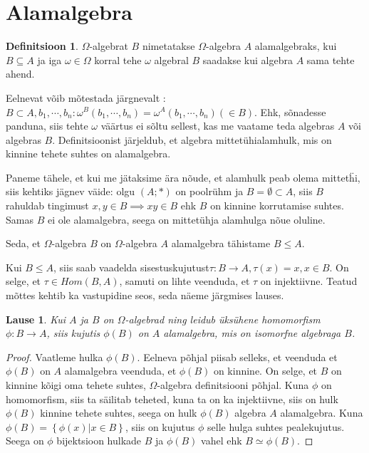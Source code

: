\documentclass[12pt]{report}
\numberwithin{equation}{section}
\theoremstyle{definition}
\newtheorem{alamalgebra}[equation]{Definitsioon}
\theoremstyle{plain}
\newtheorem{kui_leidub_homomorfism_leidub_alamalgebra}[equation]{Lause}
\begin{document}
\section{Alamalgebra}

\begin{alamalgebra}
$\Omega$-algebrat $B$ nimetatakse $\Omega$-algebra $A$ alamalgebraks, kui $B \subseteq A$ ja iga $\omega \in \Omega$ korral tehe $\omega$ algebral $B$ saadakse kui algebra $A$ sama tehte ahend.
\end{alamalgebra}

 Eelnevat võib mõtestada järgnevalt : $B \subset A, b_1,\cdots,b_n : \omega^B (b_1,\cdots,b_n) = \omega^A (b_1,\cdots,b_n) ( \in B)$. Ehk, sõnadesse panduna, siis tehte $\omega$ väärtus ei sõltu sellest, kas me vaatame teda algebras $A$ või algebras $B$.  
Definitsioonist järjeldub, et algebra mittet\"uhialamhulk, mis on kinnine tehete suhtes on alamalgebra. 
 
Paneme tähele, et kui me jätaksime ära nõude, et alamhulk peab olema mittet\"hi, siis kehtiks jägnev väide:  olgu  $(A;*)$ on poolr\"uhm ja $B= \emptyset \subset A$, siis $B$ rahuldab tingimust $ x,y \in B \implies xy \in B $ ehk $B$ on kinnine korrutamise suhtes. Samas $B$ ei ole alamalgebra, seega on  mittet\"uhja alamhulga nõue oluline. 

Seda, et $\Omega$-algebra $B$ on $\Omega$-algebra $A$ alamalgebra tähistame $B \leq A$.
 
Kui $ B \leq A$, siis saab vaadelda sisestuskujutust$ \tau : B \to A, \tau(x) = x, x \in B$. On selge, et $\tau \in Hom(B,A)$, samuti on lihte veenduda, et $\tau$ on injektiivne. 
Teatud mõttes kehtib ka vastupidine seos, seda näeme järgmises lauses.

\begin{kui_leidub_homomorfism_leidub_alamalgebra}
Kui $A$ ja $B$ on $\Omega$-algebrad ning leidub \"uks\"uhene homomorfism $\phi : B \to A $, siis kujutis $\phi(B)$ on $A$ alamalgebra, mis on isomorfne algebraga $B$.
\end{kui_leidub_homomorfism_leidub_alamalgebra}

\begin{proof}
Vaatleme hulka $\phi(B)$. Eelneva põhjal piisab selleks, et veenduda et $\phi(B)$ on $A$ alamalgebra veenduda, et $\phi(B)$ on kinnine. On selge, et $B$ on kinnine kõigi oma tehete suhtes, $\Omega$-algebra definitsiooni põhjal. Kuna $\phi$ on homomorfism, siis ta säilitab teheted, kuna ta on ka injektiivne, siis on hulk $\phi(B)$ kinnine tehete suhtes, seega on hulk $\phi(B)$ algebra $A$ alamalgebra. Kuna $\phi(B) = \left\{ \phi(x) | x \in B \right\} $, siis on kujutus $\phi$ selle hulga suhtes pealekujutus. Seega on $\phi$ bijektsioon hulkade $B$ ja $\phi(B)$ vahel ehk $B \simeq \phi(B)$. 
  

\end{proof}
\end{document}
